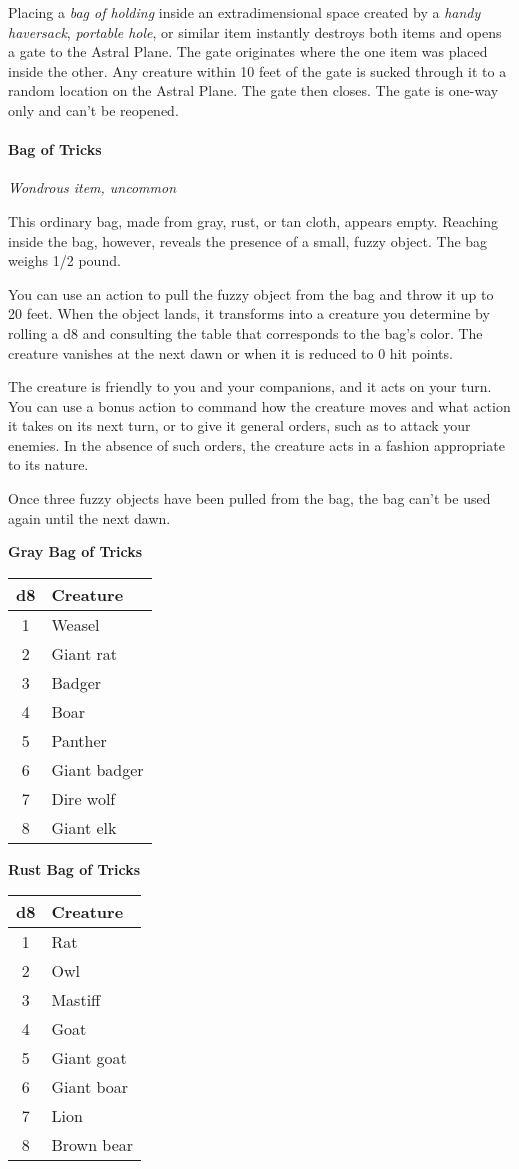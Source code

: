 \documentclass[
]{article}
\begin{document}
Placing a \emph{bag of holding} inside an extradimensional space created
by a \emph{handy haversack}, \emph{portable hole}, or similar item
instantly destroys both items and opens a gate to the Astral Plane. The
gate originates where the one item was placed inside the other. Any
creature within 10 feet of the gate is sucked through it to a random
location on the Astral Plane. The gate then closes. The gate is one-way
only and can't be reopened.

\hypertarget{bag-of-tricks}{%
\paragraph{Bag of Tricks}\label{bag-of-tricks}}

\emph{Wondrous item, uncommon}

This ordinary bag, made from gray, rust, or tan cloth, appears empty.
Reaching inside the bag, however, reveals the presence of a small, fuzzy
object. The bag weighs 1/2 pound.

You can use an action to pull the fuzzy object from the bag and throw it
up to 20 feet. When the object lands, it transforms into a creature you
determine by rolling a d8 and consulting the table that corresponds to
the bag's color. The creature vanishes at the next dawn or when it is
reduced to 0 hit points.

The creature is friendly to you and your companions, and it acts on your
turn. You can use a bonus action to command how the creature moves and
what action it takes on its next turn, or to give it general orders,
such as to attack your enemies. In the absence of such orders, the
creature acts in a fashion appropriate to its nature.

Once three fuzzy objects have been pulled from the bag, the bag can't be
used again until the next dawn.

\textbf{Gray Bag of Tricks}

\begin{longtable}[]{@{}cl@{}}
\toprule
d8 & Creature\tabularnewline
\midrule
\endhead
1 & Weasel\tabularnewline
2 & Giant rat\tabularnewline
3 & Badger\tabularnewline
4 & Boar\tabularnewline
5 & Panther\tabularnewline
6 & Giant badger\tabularnewline
7 & Dire wolf\tabularnewline
8 & Giant elk\tabularnewline
\bottomrule
\end{longtable}

\textbf{Rust Bag of Tricks}

\begin{longtable}[]{@{}cl@{}}
\toprule
d8 & Creature\tabularnewline
\midrule
\endhead
1 & Rat\tabularnewline
2 & Owl\tabularnewline
3 & Mastiff\tabularnewline
4 & Goat\tabularnewline
5 & Giant goat\tabularnewline
6 & Giant boar\tabularnewline
7 & Lion\tabularnewline
8 & Brown bear\tabularnewline
\bottomrule
\end{longtable}
\end{document}
